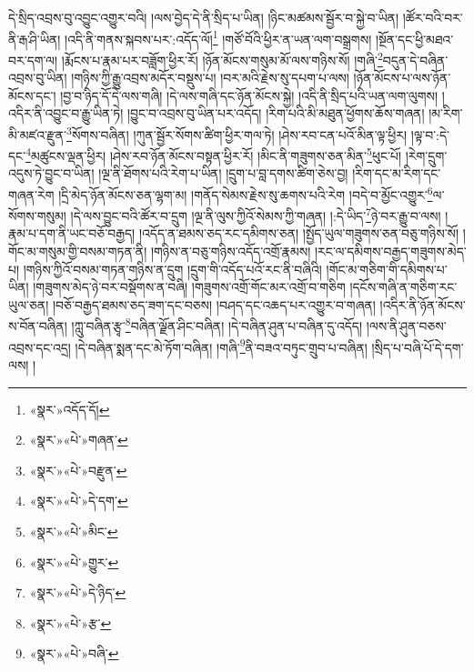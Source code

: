 དེ་སྲིད་འབྲས་བུ་འབྱུང་འགྱུར་བའི། །ལས་བྱེད་དེ་ནི་སྲིད་པ་ཡིན། །ཉིང་མཚམས་སྦྱོར་བ་སྐྱེ་བ་ཡིན། །ཚོར་བའི་བར་ནི་རྒ་ཤི་ཡིན། །འདི་ནི་གནས་སྐབས་པར་:འདོད་ལོ།\footnote{«སྣར་»འདོད་དོ།} །གཙོ་བོའི་ཕྱིར་ན་ཡན་ལག་བསྒྲགས། །སྔོན་དང་ཕྱི་མཐའ་བར་དག་ལ། །རྨོངས་པ་རྣམ་པར་བཟློག་ཕྱིར་རོ། །ཉོན་མོངས་གསུམ་མོ་ལས་གཉིས་སོ། །གཞི་\footnote{«སྣར་»«པེ་»གཞན་}བདུན་དེ་བཞིན་འབྲས་བུ་ཡིན། །གཉིས་ཀྱི་རྒྱུ་འབྲས་མདོར་བསྡུས་པ། །བར་མའི་རྗེས་སུ་དཔག་པ་ལས། །ཉོན་མོངས་པ་ལས་ཉོན་མོངས་དང་། །བྱ་བ་ཉིད་དོ་དེ་ལས་གཞི། །དེ་ལས་གཞི་དང་ཉོན་མོངས་སྐྱེ། །འདི་ནི་སྲིད་པའི་ཡན་ལག་ལུགས། །འདིར་ནི་འབྱུང་བ་རྒྱུ་ཡིན་ཏེ། །བྱུང་བ་འབྲས་བུ་ཡིན་པར་འདོད། །རིག་པའི་མི་མཐུན་ཕྱོགས་ཆོས་གཞན། །མ་རིག་མི་མཛའ་རྫུན་\footnote{«སྣར་»«པེ་»བརྫུན་}སོགས་བཞིན། །ཀུན་སྦྱོར་སོགས་ཚིག་ཕྱིར་གལ་ཏེ། །ཤེས་རབ་ངན་པའོ་མིན་ལྟ་ཕྱིར། །ལྟ་བ་:དེ་དང་\footnote{«སྣར་»«པེ་»དེ་དག་}མཚུངས་ལྡན་ཕྱིར། །ཤེས་རབ་ཉོན་མོངས་བསྟན་ཕྱིར་རོ། །མིང་ནི་གཟུགས་ཅན་མིན་\footnote{«སྣར་»«པེ་»མིང་}ཕུང་པོ། །རེག་དྲུག་འདུས་ཏེ་བྱུང་བ་ཡིན། །ལྔ་ནི་ཐོགས་པའི་རེག་པ་ཡིན། །དྲུག་པ་བླ་དགས་ཚིག་ཅེས་བྱ། །རིག་དང་མ་རིག་དང་གཞན་རེག །དྲི་མེད་ཉོན་མོངས་ཅན་ལྷག་མ། །གནོད་སེམས་རྗེས་སུ་ཆགས་པའི་རེག །བདེ་བ་མྱོང་འགྱུར་\footnote{«སྣར་»«པེ་»གྱུར་}ལ་སོགས་གསུམ། །དེ་ལས་བྱུང་བའི་ཚོར་བ་དྲུག །ལྔ་ནི་ལུས་ཀྱིའོ་སེམས་ཀྱི་གཞན། །:དེ་ཡིད་\footnote{«སྣར་»«པེ་»དེ་ཉིད་}ཉེ་བར་རྒྱུ་བ་ལས། །རྣམ་པ་དག་ནི་ཡང་བཅོ་བརྒྱད། །འདོད་ན་ཐམས་ཅད་རང་དམིགས་ཅན། །སྤྱོད་ཡུལ་གཟུགས་ཅན་བཅུ་གཉིས་སོ། །གོང་མ་གསུམ་གྱི་བསམ་གཏན་ནི། །གཉིས་ན་བཅུ་གཉིས་འདོད་འགྲོ་རྣམས། །རང་ལ་དམིགས་བརྒྱད་གཟུགས་མེད་པ། །གཉིས་ཀྱིའོ་བསམ་གཏན་གཉིས་ན་དྲུག །དྲུག་གི་འདོད་པའོ་རང་ནི་བཞིའི། །གོང་མ་གཅིག་གི་དམིགས་པ་ཡིན། །གཟུགས་མེད་ཉེ་བར་བསྡོགས་ན་བཞི། །གཟུགས་འགྲོ་གོང་མར་འགྲོ་བ་གཅིག །དངོས་གཞི་ན་གཅིག་རང་ཡུལ་ཅན། །བཅོ་བརྒྱད་ཐམས་ཅད་ཟག་དང་བཅས། །བཤད་དང་འཆད་པར་འགྱུར་བ་གཞན། །འདིར་ནི་ཉོན་མོངས་ས་བོན་བཞིན། །ཀླུ་བཞིན་རྩྭ་\footnote{«སྣར་»«པེ་»རྩ་}བཞིན་ལྗོན་ཤིང་བཞིན། །དེ་བཞིན་ཤུན་པ་བཞིན་དུ་འདོད། །ལས་ནི་ཤུན་བཅས་འབྲས་དང་འདྲ། །དེ་བཞིན་སྨན་དང་མེ་ཏོག་བཞིན། །གཞི་\footnote{«སྣར་»«པེ་»བཞི་}ནི་བཟའ་བཏུང་གྲུབ་པ་བཞིན། །སྲིད་པ་བཞི་པོ་དེ་དག་ལས། །
